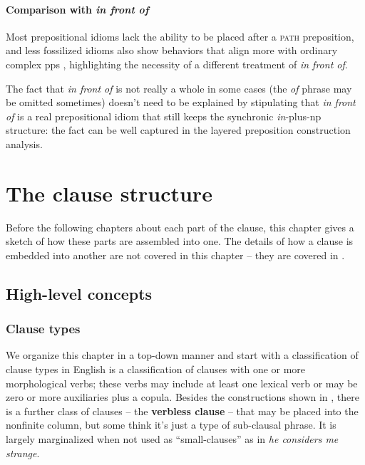 \documentclass[UTF8, a4paper, oneside, scheme=plain, 12pt]{ctexbook}
\newcommand*{\citepage}[1]{p.~{#1}}
\newcommand*{\concept}[1]{\textbf{#1}}
\newcommand{\form}[1]{\emph{#1}}
\newcommand{\category}[1]{\textsc{#1}}
\begin{document}
\subsubsection{Comparison with \form{in front of}}\label{sec:np.pp.idiom.in-front-of}

Most prepositional idioms lack the ability 
to be placed after a \category{path} preposition,
and less fossilized idioms also show behaviors that align more with ordinary complex \acs{pp}s 
\citep[\citepage{620}]{cgel},
highlighting the necessity of a different treatment of \form{in front of}.

The fact that \form{in front of} is not really a whole in some cases 
(the \form{of} phrase may be omitted sometimes) 
doesn't need to be explained by stipulating that 
\form{in front of} is a real prepositional idiom that 
still keeps the synchronic \form{in}-plus-\acs{np} structure:
the fact can be well captured in the layered preposition construction analysis.

\chapter{The clause structure}\label{chap:simple-clause}

Before the following chapters about each part of the clause,
this chapter gives a sketch of how these parts are assembled into one.
The details of how a clause is embedded into another are not covered in this chapter
-- they are covered in .

\section{High-level concepts}

\subsection{Clause types}\label{sec:moods}

We organize this chapter in a top-down manner and 
start with a classification of clause types in English
 is a classification of clauses with one or more morphological verbs;
these verbs may include at least one lexical verb 
or may be zero or more auxiliaries plus a copula.
Besides the constructions shown in ,
there is a further class of clauses 
-- the \concept{verbless clause} \citep[\citepage{1266}]{cgel} -- 
that may be placed into the nonfinite column,
but some think it's just a type of sub-clausal phrase.
It is largely marginalized when not used as ``small-clauses'' 
as in \form{he considers me strange}.
\end{document}
